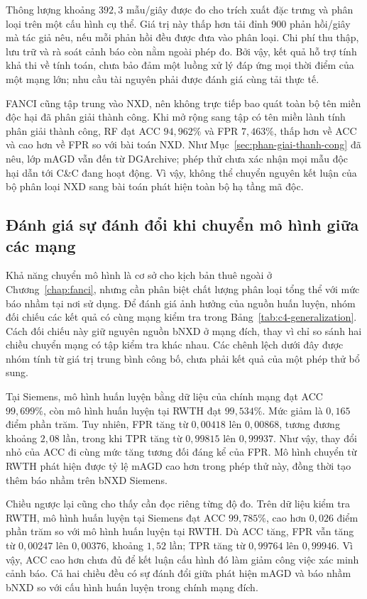 Thông lượng khoảng $392{,}3$ mẫu/giây được đo cho trích xuất đặc trưng và phân loại trên một cấu hình cụ thể. Giá trị này thấp hơn tải đỉnh 900 phản hồi/giây mà tác giả nêu, nếu mỗi phản hồi đều được đưa vào phân loại. Chi phí thu thập, lưu trữ và rà soát cảnh báo còn nằm ngoài phép đo. Bởi vậy, kết quả hỗ trợ tính khả thi về tính toán, chưa bảo đảm một luồng xử lý đáp ứng mọi thời điểm của một mạng lớn; nhu cầu tài nguyên phải được đánh giá cùng tải thực tế.

FANCI cũng tập trung vào NXD, nên không trực tiếp bao quát toàn bộ tên miền độc hại đã phân giải thành công. Khi mở rộng sang tập có tên miền lành tính phân giải thành công, RF đạt ACC $94{,}962\%$ và FPR $7{,}463\%$, thấp hơn về ACC và cao hơn về FPR so với bài toán NXD. Như Mục~\ref{sec:phan-giai-thanh-cong} đã nêu, lớp mAGD vẫn đến từ DGArchive; phép thử chưa xác nhận mọi mẫu độc hại dẫn tới C\&C đang hoạt động. Vì vậy, không thể chuyển nguyên kết luận của bộ phân loại NXD sang bài toán phát hiện toàn bộ hạ tầng mã độc.

\subsection{Đánh giá sự đánh đổi khi chuyển mô hình giữa các mạng}\label{sec:c5-danh-doi-chuyen-mang}

Khả năng chuyển mô hình là cơ sở cho kịch bản thuê ngoài ở Chương~\ref{chap:fanci}, nhưng cần phân biệt chất lượng phân loại tổng thể với mức báo nhầm tại nơi sử dụng. Để đánh giá ảnh hưởng của nguồn huấn luyện, nhóm đối chiếu các kết quả có cùng mạng kiểm tra trong Bảng~\ref{tab:c4-generalization}. Cách đối chiếu này giữ nguyên nguồn bNXD ở mạng đích, thay vì chỉ so sánh hai chiều chuyển mạng có tập kiểm tra khác nhau. Các chênh lệch dưới đây được nhóm tính từ giá trị trung bình công bố, chưa phải kết quả của một phép thử bổ sung.

Tại Siemens, mô hình huấn luyện bằng dữ liệu của chính mạng đạt ACC $99{,}699\%$, còn mô hình huấn luyện tại RWTH đạt $99{,}534\%$. Mức giảm là $0{,}165$ điểm phần trăm. Tuy nhiên, FPR tăng từ $0{,}00418$ lên $0{,}00868$, tương đương khoảng $2{,}08$ lần, trong khi TPR tăng từ $0{,}99815$ lên $0{,}99937$. Như vậy, thay đổi nhỏ của ACC đi cùng mức tăng tương đối đáng kể của FPR. Mô hình chuyển từ RWTH phát hiện được tỷ lệ mAGD cao hơn trong phép thử này, đồng thời tạo thêm báo nhầm trên bNXD Siemens.

Chiều ngược lại cũng cho thấy cần đọc riêng từng độ đo. Trên dữ liệu kiểm tra RWTH, mô hình huấn luyện tại Siemens đạt ACC $99{,}785\%$, cao hơn $0{,}026$ điểm phần trăm so với mô hình huấn luyện tại RWTH. Dù ACC tăng, FPR vẫn tăng từ $0{,}00247$ lên $0{,}00376$, khoảng $1{,}52$ lần; TPR tăng từ $0{,}99764$ lên $0{,}99946$. Vì vậy, ACC cao hơn chưa đủ để kết luận cấu hình đó làm giảm công việc xác minh cảnh báo. Cả hai chiều đều có sự đánh đổi giữa phát hiện mAGD và báo nhầm bNXD so với cấu hình huấn luyện trong chính mạng đích.


